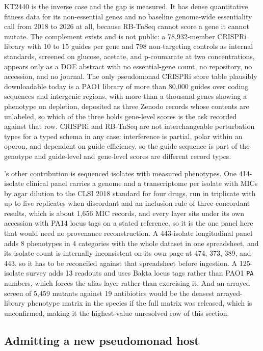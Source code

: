 KT2440 is the inverse case and the gap is measured. It has dense quantitative fitness data for
its non-essential genes and no baseline genome-wide essentiality call from 2018 to 2026 at all,
because RB-TnSeq cannot score a gene it cannot mutate. The complement exists and is not
public: a 78,932-member CRISPRi library with 10 to 15 guides per gene and 798 non-targeting
controls as internal standards, screened on glucose, acetate, and p-coumarate at two
concentrations, appears only as a DOE abstract with no essential-gene count, no repository, no
accession, and no journal. The only pseudomonad CRISPRi score table plausibly downloadable
today is a PAO1 library of more than 80,000 guides over coding sequences and intergenic
regions, with more than a thousand genes showing a phenotype on depletion, deposited as three
Zenodo records whose contents are unlabeled, so which of the three holds gene-level scores is
the ask recorded against that row. CRISPRi and RB-TnSeq are not interchangeable perturbation
types for a typed schema in any case: interference is partial, polar within an operon, and
dependent on guide efficiency, so the guide sequence is part of the genotype and guide-level
and gene-level scores are different record types.

's other contribution is sequenced isolates with measured phenotypes. One
414-isolate clinical panel carries a genome and a transcriptome per isolate with MICs by agar
dilution to the CLSI 2018 standard for four drugs, run in triplicate with up to five replicates
when discordant and an inclusion rule of three concordant results, which is about 1,656 MIC
records, and every layer sits under its own accession with PA14 locus tags on a stated
reference, so it is the one panel here that would need no provenance reconstruction. A
443-isolate longitudinal panel adds 8 phenotypes in 4 categories with the whole dataset in one
spreadsheet, and its isolate count is internally inconsistent on its own page at 474, 373, 389,
and 443, so it has to be reconciled against that spreadsheet before ingestion. A 125-isolate
survey adds 13 readouts and uses Bakta locus tags rather than PAO1 \texttt{PA} numbers, which
forces the alias layer rather than exercising it. And an arrayed screen of 5,459 mutants against
19 antibiotics would be the densest arrayed-library phenotype matrix in the species if the full
matrix was released, which is unconfirmed, making it the highest-value unresolved row of this
section.

\subsection{Admitting a new pseudomonad host}\label{sec:pseudo-admit}

